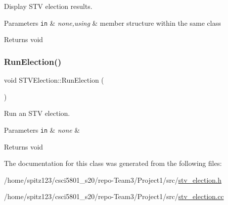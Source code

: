 Display S\+TV election results. 


\begin{DoxyParams}[1]{Parameters}
\mbox{\tt in}  & {\em none,using} & member structure within the same class \\
\hline
\end{DoxyParams}
\begin{DoxyReturn}{Returns}
void 
\end{DoxyReturn}
\mbox{\label{classSTVElection_a3b80c78d70ba3dc7181884b0dfcf142e}} 
\subsubsection{\texorpdfstring{Run\+Election()}{RunElection()}}
{\footnotesize\ttfamily void S\+T\+V\+Election\+::\+Run\+Election (\begin{DoxyParamCaption}{ }\end{DoxyParamCaption})}



Run an S\+TV election. 


\begin{DoxyParams}[1]{Parameters}
\mbox{\tt in}  & {\em none} & \\
\hline
\end{DoxyParams}
\begin{DoxyReturn}{Returns}
void 
\end{DoxyReturn}


The documentation for this class was generated from the following files\+:\begin{DoxyCompactItemize}
\item 
/home/spitz123/csci5801\+\_\+s20/repo-\/\+Team3/\+Project1/src/\hyperlink{stv__election_8h}{stv\+\_\+election.\+h}\item 
/home/spitz123/csci5801\+\_\+s20/repo-\/\+Team3/\+Project1/src/\hyperlink{stv__election_8cc}{stv\+\_\+election.\+cc}\end{DoxyCompactItemize}
